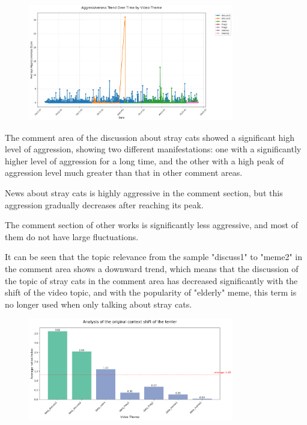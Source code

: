 \documentclass[12pt,a4paper]{ctexart}
\theoremstyle{MyLineTheoremStyle}
\theoremstyle{MyBlockTheoremStyle}
\theoremstyle{MySubsubsectionStyle}
\begin{document}
\begin{figure}[htbp]
    \centering
    \includegraphics[width=0.8\textwidth]{img/aggressive_trend.png}
\end{figure}
\newpage

The comment area of the discussion about stray cats showed a significant high level of aggression, showing two different manifestations: one with a significantly higher level of aggression for a long time, and the other with a high peak of aggression level much greater than that in other comment areas.

News about stray cats is highly aggressive in the comment section, but this aggression gradually decreases after reaching its peak.

The comment section of other works is significantly less aggressive, and most of them do not have large fluctuations.

It can be seen that the topic relevance from the sample "discuss1" to "meme2" in the comment area shows a downward trend, which means that the discussion of the topic of stray cats in the comment area has decreased significantly with the shift of the video topic, and with the popularity of "elderly" meme, this term is no longer used when only talking about stray cats.

\begin{figure}[htbp]
    \centering
    \includegraphics[width=0.8\textwidth]{img/context_shift.png}
\end{figure}
\newpage
\end{document}
